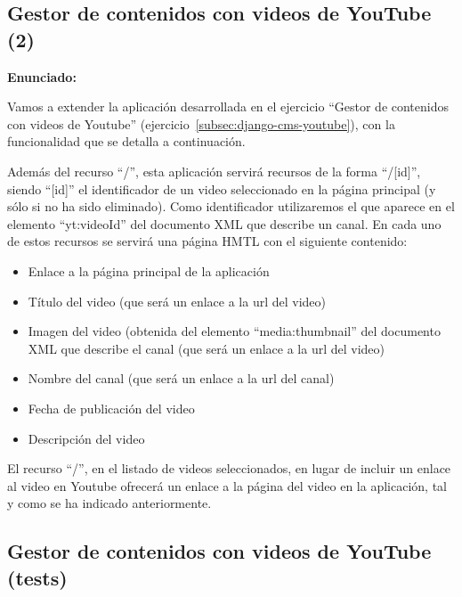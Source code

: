 \subsection{Gestor de contenidos con videos de YouTube (2)}
\label{subsec:django-cms-youtube-2}

\textbf{Enunciado:}

Vamos a extender la aplicación desarrollada en el ejercicio ``Gestor de contenidos con videos de Youtube'' (ejercicio~\ref{subsec:django-cms-youtube}), con la funcionalidad que se detalla a continuación.

Además del recurso ``/'', esta aplicación servirá recursos de la forma ``/[id]'', siendo ``[id]'' el identificador de un video seleccionado en la página principal (y sólo si no ha sido eliminado). Como identificador utilizaremos el que aparece en el elemento ``yt:videoId'' del documento XML que describe un canal. En cada uno de estos recursos se servirá una página HMTL con el siguiente contenido:

\begin{itemize}
\item Enlace a la página principal de la aplicación
\item Título del video (que será un enlace a la url del video)
\item Imagen del video (obtenida del elemento ``media:thumbnail'' del documento XML que describe el canal (que será un enlace a la url del video)
\item Nombre del canal (que será un enlace a la url del canal)
\item Fecha de publicación del video
\item Descripción del video
\end{itemize}

El recurso ``/'', en el listado de videos seleccionados, en lugar de incluir un enlace al video en Youtube ofrecerá un enlace a la página del video en la aplicación, tal y como se ha indicado anteriormente.

\subsection{Gestor de contenidos con videos de YouTube (tests)}
\label{subsec:django-cms-youtube-tests}


